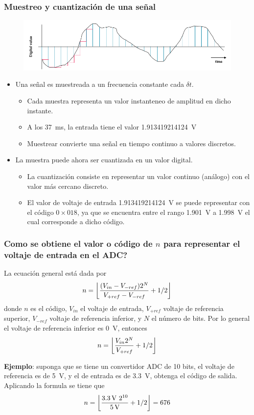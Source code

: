 \documentclass[10.5pt,scale=1.0,t,aspectratio=169,hyperref={pdfpagelabels=false}]{beamer}
\DeclarePairedDelimiter\floor{\lfloor}{\rfloor}
\begin{document}
\begin{frame}
	\frametitle{Muestreo y cuantización de una señal}
	
	\begin{figure}
		\centering\includegraphics[scale=0.45]{fig_Sampling}
	\end{figure}
	
	\begin{itemize}
		\item Una señal es muestreada a un frecuencia constante cada $\delta t$.
		\begin{itemize}
			\item Cada muestra representa un valor instanteneo de amplitud en dicho instante.
			\item A los \SI{37}{\milli\second}, la entrada tiene el valor \SI{1.913419214124}{\volt}
			\item Muestrear convierte una señal en tiempo continuo a valores discretos. 
		\end{itemize}
		\item La muestra puede ahora ser cuantizada en un valor digital.
		\begin{itemize}
			\item La cuantización consiste en representar un valor continuo (análogo) con el valor más cercano discreto. 
			\item El valor de voltaje de entrada \SI{1.913419214124}{\volt} se puede representar con el código $0\times018$, ya que se encuentra entre el rango \SI{1.901}{\volt} a \SI{1.998}{\volt} el cual corresponde a dicho código. 
		\end{itemize}
	\end{itemize}
\end{frame}
\begin{frame}
	\frametitle{Como se obtiene el valor o código de $n$ para representar el voltaje de entrada en el ADC?}
	{\small
		
		La ecuación general está dada por
		$$n = \floor*{\frac{(V_{in}-V_{-ref})2^N}{V_{+ref}-V_{-ref}}+1/2}$$
		donde $n$ es el código, $V_{in}$ el voltaje de entrada, $V_{+ref}$ voltaje de referencia superior, $V_{-ref}$ voltaje de referencia inferior, y $N$ el número de bits. Por lo general el voltaje de referencia inferior es \SI{0}{\volt}, entonces
		$$n = \floor*{\frac{V_{in}2^N}{V_{+ref}}+1/2}$$
		
		\textbf{Ejemplo}: suponga que se tiene un convertidor ADC de 10 bits, el voltaje de referencia es de \SI{5}{\volt}, y el de entrada es de \SI{3.3}{\volt}, obtenga el código de salida. Aplicando la formula se tiene que
		$$n = \floor*{\frac{\SI{3.3}{\volt} \ 2^{10}}{\SI{5}{\volt}}+1/2} = 676$$
}	
\end{frame}
\end{document}
